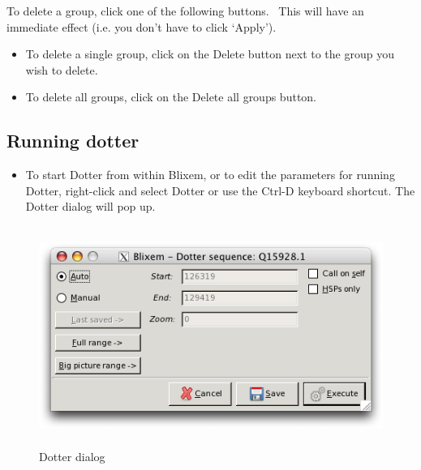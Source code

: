 \documentclass[letterpaper]{article}
\newcommand\liststyleWWviiiNumxxxvii{%
\renewcommand\labelitemi{{\textbullet}}
\renewcommand\labelitemii{o}
\renewcommand\labelitemiii{[F0A7?]}
\renewcommand\labelitemiv{[F0B7?]}
}
\begin{document}
\bigskip

{
To delete a group, click one of the following buttons. \ This will have
an immediate effect (i.e. you don{\textquoteright}t have to click
{\textquoteleft}Apply{\textquoteright}).}

\liststyleWWviiiNumxxxvii
\begin{itemize}
\item {
To delete a single group, click on the
{\textquotesingle}Delete{\textquotesingle} button next to the group you
wish to delete.}
\item {
To delete all groups, click on the {\textquotesingle}Delete all
groups{\textquotesingle} button.}
\end{itemize}
{\color[rgb]{0.30980393,0.5058824,0.7411765}\subsection[Running dotter]{Running dotter}}
\hypertarget{RefHeading2161056909880}{}\liststyleWWviiiNumxxxvii
\begin{itemize}
\item {
To start Dotter from within Blixem, or to edit the parameters for
running Dotter, right-click and select
{\textquotesingle}Dotter{\textquotesingle} or use the Ctrl-D keyboard
shortcut. The Dotter dialog will pop up.}
\end{itemize}

\begin{figure}
\centering
\color[rgb]{0.30980393,0.5058824,0.7411765}
\includegraphics[width=13.215cm,height=7.165cm]{img_dialog_dotter.png}
\caption{Dotter dialog}
\end{figure}
\end{document}
